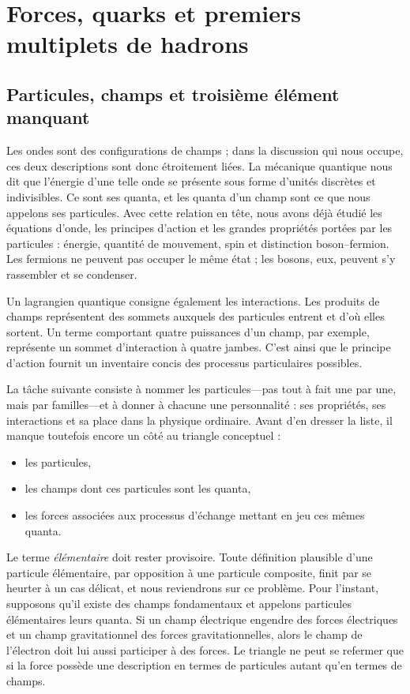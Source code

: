 \chapter{Forces, quarks et premiers multiplets de hadrons}

\section{Particules, champs et troisième élément manquant}

Les ondes sont des configurations de champs ; dans la discussion qui nous occupe, ces deux descriptions sont donc étroitement liées. La mécanique quantique nous dit que l’énergie d’une telle onde se présente sous forme d’unités discrètes et indivisibles. Ce sont ses quanta, et les quanta d’un champ sont ce que nous appelons ses particules. Avec cette relation en tête, nous avons déjà étudié les équations d’onde, les principes d’action et les grandes propriétés portées par les particules : énergie, quantité de mouvement, spin et distinction boson--fermion. Les fermions ne peuvent pas occuper le même état ; les bosons, eux, peuvent s’y rassembler et se condenser.

Un lagrangien quantique consigne également les interactions. Les produits de champs représentent des sommets auxquels des particules entrent et d’où elles sortent. Un terme comportant quatre puissances d’un champ, par exemple, représente un sommet d’interaction à quatre jambes. C’est ainsi que le principe d’action fournit un inventaire concis des processus particulaires possibles.

La tâche suivante consiste à nommer les particules---pas tout à fait une par une, mais par familles---et à donner à chacune une personnalité : ses propriétés, ses interactions et sa place dans la physique ordinaire. Avant d’en dresser la liste, il manque toutefois encore un côté au triangle conceptuel :
\begin{itemize}
\item les particules,
\item les champs dont ces particules sont les quanta,
\item les forces associées aux processus d’échange mettant en jeu ces mêmes quanta.
\end{itemize}

Le terme \emph{élémentaire} doit rester provisoire. Toute définition plausible d’une particule élémentaire, par opposition à une particule composite, finit par se heurter à un cas délicat, et nous reviendrons sur ce problème. Pour l’instant, supposons qu’il existe des champs fondamentaux et appelons particules élémentaires leurs quanta. Si un champ électrique engendre des forces électriques et un champ gravitationnel des forces gravitationnelles, alors le champ de l’électron doit lui aussi participer à des forces. Le triangle ne peut se refermer que si la force possède une description en termes de particules autant qu’en termes de champs.

